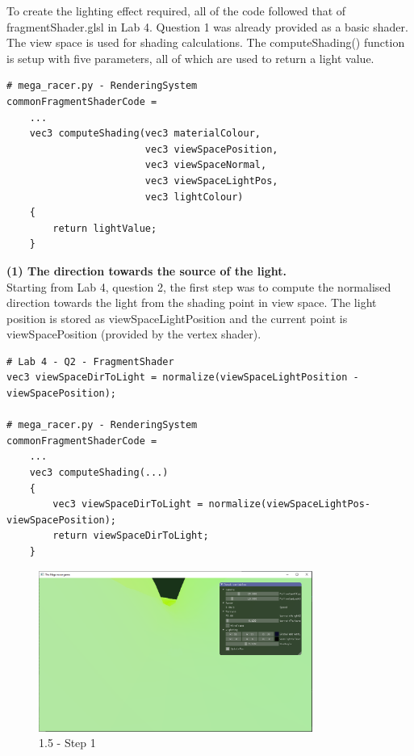 \documentclass[a4 paper, 12pt]{article}
\begin{document}
To create the lighting effect required, all of the code followed that of fragmentShader.glsl in Lab 4. Question 1 was already provided as a basic shader. The view space is used for shading calculations. The computeShading() function is setup with five parameters, all of which are used to return a light value.
    \begin{lstlisting}
# mega_racer.py - RenderingSystem
commonFragmentShaderCode =
    ...
    vec3 computeShading(vec3 materialColour, 
                        vec3 viewSpacePosition, 
                        vec3 viewSpaceNormal, 
                        vec3 viewSpaceLightPos, 
                        vec3 lightColour)
    {
        return lightValue;
    }
    \end{lstlisting}

\textbf{(1) The direction towards the source of the light.} \\
Starting from Lab 4, question 2, the first step was to compute the normalised direction towards the light from the shading point in view space. The light position is stored as viewSpaceLightPosition and the current point is viewSpacePosition (provided by the vertex shader). 
    \begin{lstlisting}
# Lab 4 - Q2 - FragmentShader
vec3 viewSpaceDirToLight = normalize(viewSpaceLightPosition - viewSpacePosition);
    
# mega_racer.py - RenderingSystem
commonFragmentShaderCode =
    ...
    vec3 computeShading(...)
    {
        vec3 viewSpaceDirToLight = normalize(viewSpaceLightPos- viewSpacePosition);
        return viewSpaceDirToLight;
    }
    \end{lstlisting}

    \begin{figure} [H]
        \centering
        \includegraphics[width=0.8\textwidth, frame]
            {./images/mega_racer/1.5_a.PNG}
        \caption{1.5 - Step 1}
    \end{figure}
\end{document}
